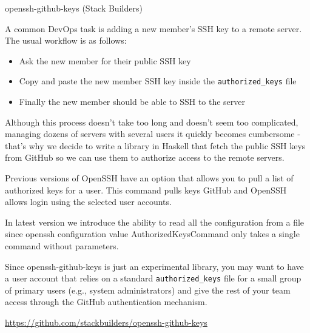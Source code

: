 \documentclass[DIV16,twocolumn,10pt]{scrreprt}
\begin{document}
\begin{hcarentry}{openssh-github-keys (Stack Builders)}
\makeheader

A common DevOps task is adding a new member's SSH key to a remote server. The
usual workflow is as follows:

\begin{itemize}
  \item Ask the new member for their public SSH key
  \item Copy and paste the new member SSH key inside the \texttt{authorized\_keys} file
  \item Finally the new member should be able to SSH to the server
\end{itemize}

Although this process doesn't take too long and doesn't seem too complicated,
managing dozens of servers with several users it quickly becomes cumbersome -
that's why we decide to write a library in Haskell that fetch the public SSH
keys from GitHub so we can use them to authorize access to the remote servers.

Previous versions of OpenSSH have an option that allows you to pull a list of
authorized keys for a user. This command pulls keys GitHub and OpenSSH allows
login using the selected user accounts.

In latest version we introduce the ability to read all the configuration from a
file since openssh configuration value AuthorizedKeysCommand only takes a
single command without parameters.

Since openssh-github-keys is just an experimental library, you may want to have
a user account that relies on a standard \texttt{authorized\_keys} file for a small group
of primary users (e.g., system administrators) and give the rest of your team
access through the GitHub authentication mechanism.

\FurtherReading
  \url{https://github.com/stackbuilders/openssh-github-keys}
\end{hcarentry}
\end{document}
